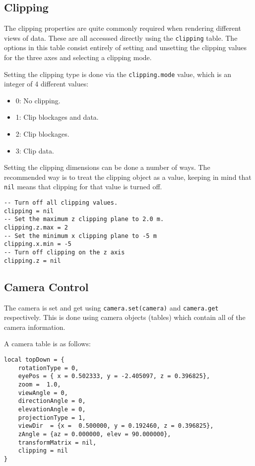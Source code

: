 \documentclass[11pt,twoside]{book}
\begin{document}
\subsection{Clipping}

The clipping properties are quite commonly required when rendering different
views of data. These are all accesssed directly using the \lstinline{clipping}
table. The options in this table consist entirely of setting and unsetting the
clipping values for the three axes and selecting a clipping mode.

Setting the clipping type is done via the \lstinline{clipping.mode} value, which
is an integer of 4 different values:

\begin{itemize}
\item 0: No clipping.
\item 1: Clip blockages and data.
\item 2: Clip blockages.
\item 3: Clip data.
\end{itemize}

Setting the clipping dimensions can be done a number of ways. The recommended
way is to treat the clipping object as a value, keeping in mind that
\lstinline{nil} means that clipping for that value is turned off.

\begin{lstlisting}[style=lua]
-- Turn off all clipping values.
clipping = nil
-- Set the maximum z clipping plane to 2.0 m.
clipping.z.max = 2
-- Set the minimum x clipping plane to -5 m
clipping.x.min = -5
-- Turn off clipping on the z axis
clipping.z = nil
\end{lstlisting}

\subsection{Camera Control}

The camera is set and get using \lstinline{camera.set(camera)} and
\lstinline{camera.get} respectively. This is done using camera objects (tables)
which contain all of the camera information.

A camera table is as follows:

\begin{lstlisting}[style=lua]
local topDown = {
    rotationType = 0,
    eyePos = { x = 0.502333, y = -2.405097, z = 0.396825},
    zoom =  1.0,
    viewAngle = 0,
    directionAngle = 0,
    elevationAngle = 0,
    projectionType = 1,
    viewDir  = {x =  0.500000, y = 0.192460, z = 0.396825},
    zAngle = {az = 0.000000, elev = 90.000000},
    transformMatrix = nil,
    clipping = nil
}
\end{lstlisting}
\end{document}
